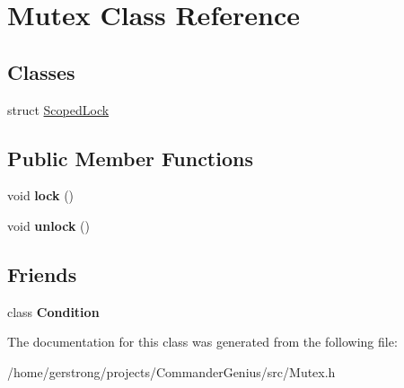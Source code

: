 \hypertarget{class_mutex}{
\section{Mutex Class Reference}
\label{class_mutex}
}
\subsection*{Classes}
\begin{DoxyCompactItemize}
\item 
struct \hyperlink{struct_mutex_1_1_scoped_lock}{ScopedLock}
\end{DoxyCompactItemize}
\subsection*{Public Member Functions}
\begin{DoxyCompactItemize}
\item 
\hypertarget{class_mutex_ad91be808bf0a60a16f10b897ec246d3a}{
void {\bfseries lock} ()}
\label{class_mutex_ad91be808bf0a60a16f10b897ec246d3a}

\item 
\hypertarget{class_mutex_a546a5b797ba29959357586aa2b3740a8}{
void {\bfseries unlock} ()}
\label{class_mutex_a546a5b797ba29959357586aa2b3740a8}

\end{DoxyCompactItemize}
\subsection*{Friends}
\begin{DoxyCompactItemize}
\item 
\hypertarget{class_mutex_a0705c7682858f6dcf7fe85cba92f0a5c}{
class {\bfseries Condition}}
\label{class_mutex_a0705c7682858f6dcf7fe85cba92f0a5c}

\end{DoxyCompactItemize}


The documentation for this class was generated from the following file:\begin{DoxyCompactItemize}
\item 
/home/gerstrong/projects/CommanderGenius/src/Mutex.h\end{DoxyCompactItemize}

